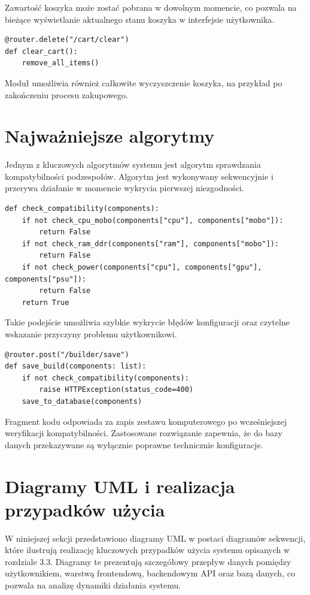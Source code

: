 \documentclass[a4paper,twoside,12pt]{book}
\begin{document}
Zawartość koszyka może zostać pobrana w dowolnym momencie, co pozwala na bieżące
wyświetlanie aktualnego stanu koszyka w interfejsie użytkownika.

\begin{verbatim}
@router.delete("/cart/clear")
def clear_cart():
    remove_all_items()
\end{verbatim}

Moduł umożliwia również całkowite wyczyszczenie koszyka, na przykład po
zakończeniu procesu zakupowego.

\section{Najważniejsze algorytmy}

Jednym z kluczowych algorytmów systemu jest algorytm sprawdzania kompatybilności
podzespołów. Algorytm jest wykonywany sekwencyjnie i przerywa działanie w momencie
wykrycia pierwszej niezgodności.

\begin{verbatim}
def check_compatibility(components):
    if not check_cpu_mobo(components["cpu"], components["mobo"]):
        return False
    if not check_ram_ddr(components["ram"], components["mobo"]):
        return False
    if not check_power(components["cpu"], components["gpu"], components["psu"]):
        return False
    return True
\end{verbatim}

Takie podejście umożliwia szybkie wykrycie błędów konfiguracji oraz czytelne
wskazanie przyczyny problemu użytkownikowi.

\begin{verbatim}
@router.post("/builder/save")
def save_build(components: list):
    if not check_compatibility(components):
        raise HTTPException(status_code=400)
    save_to_database(components)
\end{verbatim}

Fragment kodu odpowiada za zapis zestawu komputerowego po wcześniejszej
weryfikacji kompatybilności. Zastosowane rozwiązanie zapewnia, że do bazy danych
przekazywane są wyłącznie poprawne technicznie konfiguracje.


\section{Diagramy UML i realizacja przypadków użycia}

W niniejszej sekcji przedstawiono diagramy UML w postaci diagramów sekwencji,
które ilustrują realizację kluczowych przypadków użycia systemu opisanych w
rozdziale 3.3. Diagramy te prezentują szczegółowy przepływ danych pomiędzy
użytkownikiem, warstwą frontendową, backendowym API oraz bazą danych, co pozwala
na analizę dynamiki działania systemu.
\end{document}
